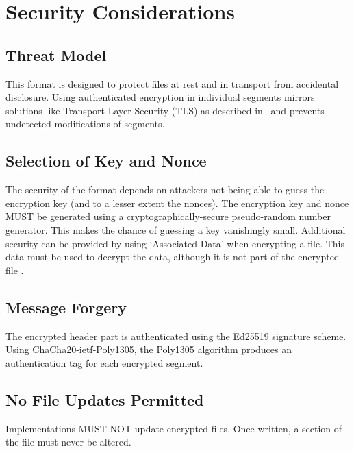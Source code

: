 \section{Security Considerations}
\subsection{Threat Model}
This format is designed to protect files at rest and in transport from accidental disclosure.
%
Using authenticated encryption in individual segments mirrors solutions like Transport Layer Security (TLS) as described in~\cite{RFC5246} and prevents undetected modifications of segments.

\subsection{Selection of Key and Nonce}
The security of the format depends on attackers not being able to guess the encryption key (and to a lesser extent the nonces).
%
The encryption key and nonce MUST be generated using a cryptographically-secure pseudo-random number generator.
%
This makes the chance of guessing a key vanishingly small.
%
Additional security can be provided by using `Associated Data' when encrypting a file.
%
This data must be used to decrypt the data, although it is not part of the encrypted file \cite{RFC8439}.

\subsection{Message Forgery}
The encrypted header part is authenticated using the Ed25519 signature scheme.
%
Using ChaCha20-ietf-Poly1305, the Poly1305 algorithm produces an authentication tag for each encrypted segment.

\subsection{No File Updates Permitted}
Implementations MUST NOT update encrypted files.
%
Once written, a section of the file must never be altered.
